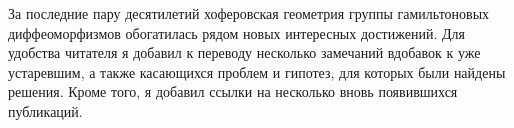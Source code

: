За последние пару десятилетий хоферовская геометрия группы
гамильтоновых диффеоморфизмов обогатилась рядом новых интересных
достижений.
Для удобства читателя я добавил к переводу несколько замечаний
вдобавок к уже устаревшим, а также касающихся проблем и гипотез, для
которых были найдены решения.
Кроме того, я добавил ссылки на несколько вновь появившихся публикаций.
